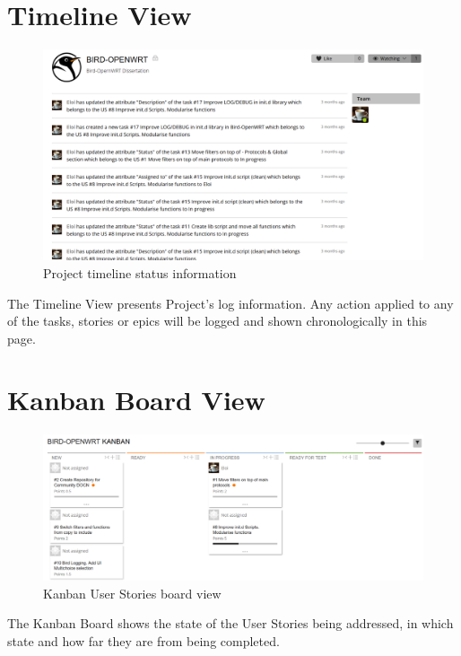 \begin{appendices}
\begin{landscape}
\section{Timeline View}
\begin{figure}[h!]
\centering
    \includegraphics[width=0.7\hsize]{images/kanban/timeline}
    \caption{Project timeline status information}
    \label{fig:ktimeline}
\end{figure}
The Timeline View presents Project's log information. Any action applied to any of the tasks, stories or epics will be logged and shown chronologically in this page.
\newpage

\section{Kanban Board View}
\begin{figure}[ht!]
\centering
    \includegraphics[width=0.85\hsize]{images/kanban/kanban}
    \caption{Kanban User Stories board view}
    \label{fig:kboard}
\end{figure}
The Kanban Board shows the state of the User Stories being addressed, in which state and how far they are from being completed.
\newpage


\end{landscape}
\end{appendices}
